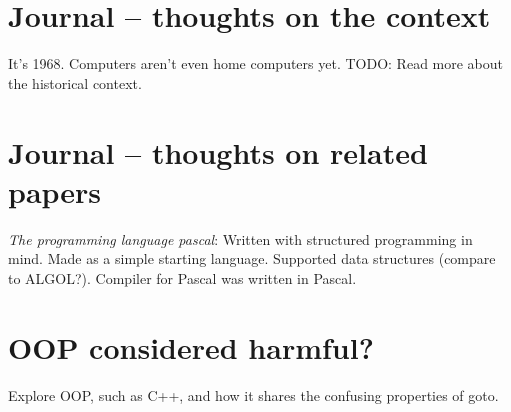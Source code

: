 \documentclass{journal}
\begin{document}
\section{Journal -- thoughts on the context}
It's 1968. Computers aren't even home computers yet. TODO: Read more about the historical context.

\section{Journal -- thoughts on related papers}
\textit{The programming language pascal}: Written with structured programming in mind. Made as a simple starting language. Supported data structures (compare to ALGOL?). Compiler for Pascal was written in Pascal.

\section{OOP considered harmful?}
Explore OOP, such as C++, and how it shares the confusing properties of goto.



\end{document}
